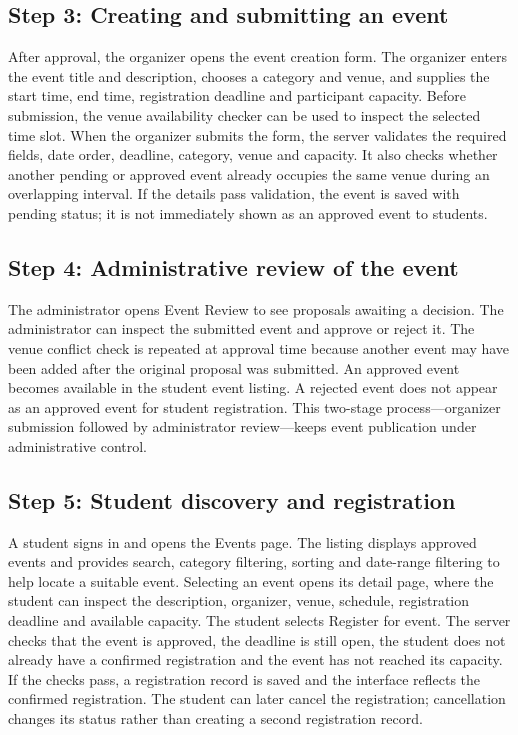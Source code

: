 \documentclass[11pt,a4paper]{article}
\begin{document}
\subsection{Step 3: Creating and submitting an event}
After approval, the organizer opens the event creation form. The organizer enters the event title
and description, chooses a category and venue, and supplies the start time, end time, registration
deadline and participant capacity. Before submission, the venue availability checker can be used
to inspect the selected time slot. When the organizer submits the form, the server validates the
required fields, date order, deadline, category, venue and capacity. It also checks whether another
pending or approved event already occupies the same venue during an overlapping interval.
If the details pass validation, the event is saved with pending status; it is not immediately shown
as an approved event to students.

\subsection{Step 4: Administrative review of the event}
The administrator opens Event Review to see proposals awaiting a decision. The administrator
can inspect the submitted event and approve or reject it. The venue conflict check is repeated at
approval time because another event may have been added after the original proposal was
submitted. An approved event becomes available in the student event listing. A rejected event
does not appear as an approved event for student registration. This two-stage process—organizer
submission followed by administrator review—keeps event publication under administrative
control.

\subsection{Step 5: Student discovery and registration}
A student signs in and opens the Events page. The listing displays approved events and provides
search, category filtering, sorting and date-range filtering to help locate a suitable event. Selecting
an event opens its detail page, where the student can inspect the description, organizer, venue,
schedule, registration deadline and available capacity. The student selects Register for event.
The server checks that the event is approved, the deadline is still open, the student does not
already have a confirmed registration and the event has not reached its capacity. If the checks
pass, a registration record is saved and the interface reflects the confirmed registration. The
student can later cancel the registration; cancellation changes its status rather than creating a
second registration record.
\end{document}
